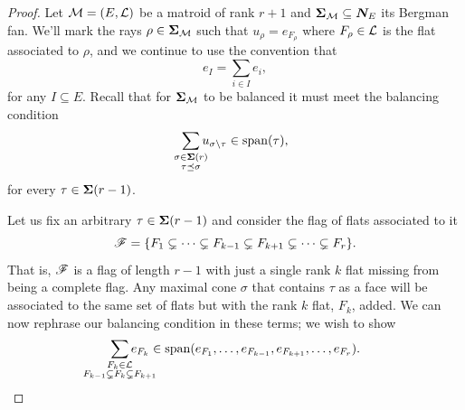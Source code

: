 \documentclass[12pt,oneside]{../../sfsuthesis}
\begin{document}
\begin{proof}
    Let \( \mathcal{M} = (E, \mathcal{L}) \) be a matroid of rank \( r + 1 \) and \( \bm{\Sigma}_{\mathcal{M}} \subseteq \bm{N}_E \) its Bergman fan.
    We'll mark the rays \( \rho \in \bm{\Sigma}_{\mathcal{M}} \) such that \( u_\rho = e_{F_\rho} \) where \( F_\rho \in \mathcal{L} \) is the flat associated to \( \rho \), and we continue to use the convention that
    \[
        e_{I} = \sum_{i \in I} e_i,
    \]
    for any \( I \subseteq E \).
    Recall that for \( \bm{\Sigma}_{\mathcal{M}} \) to be balanced it must meet the balancing condition
    \[
        \sum_{\mathclap{\substack{\sigma \in \bSigma(r) \\ \tau \preceq \sigma}}} u_{\sigma \setminus \tau} \in \Span(\tau),
    \]
    for every \( \tau \in \bm{\Sigma}(r-1) \).

    Let us fix an arbitrary \( \tau \in \bm{\Sigma}(r-1) \) and consider the flag of flats associated to it
    \[
        \mathscr{F} = \{ F_1 \subsetneq \cdots \subsetneq F_{k-1} \subsetneq  F_{k+1} \subsetneq \cdots \subsetneq F_{r} \}.
    \]
    That is, \( \mathscr{F} \) is a flag of length \( r - 1 \) with just a single rank \( k \) flat missing from being a complete flag.
    Any maximal cone \( \sigma \) that contains \( \tau \) as a face will be associated to the same set of flats but with the rank \( k \) flat, \( F_{k} \), added.
    We can now rephrase our balancing condition in these terms; we wish to show
    \[
        \sum_{\mathclap{\substack{F_k \in \cL \\ F_{k-1} \subsetneq F_k \subsetneq F_{k+1} }}} e_{F_{k}} \in \Span(e_{F_1}, \dots, e_{F_{k-1}}, e_{F_{k+1}}, \dots, e_{F_r}).
    \]



\end{proof}
\end{document}
